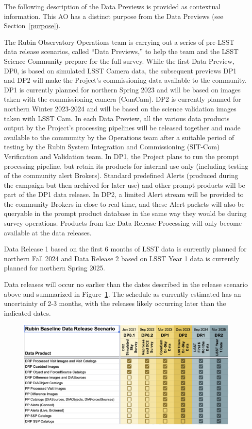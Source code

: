\documentclass[SE,authoryear,toc]{lsstdoc}
\begin{document}
The following description of the Data Previews is provided as contextual information. This AO has a distinct purpose from the Data Previews (see Section~\ref{purpose}).

The Rubin Observatory Operations team is carrying out a series of pre-LSST data release scenarios, called ``Data Previews,'' to help the team and the LSST Science Community prepare for the full survey. While the first Data Preview, DP0, is based on simulated LSST Camera data, the subsequent previews DP1 and DP2 will make the Project's commissioning data available to the community. DP1 is currently planned for northern Spring 2023 and will be based on images taken with the commissioning camera (ComCam). DP2 is currently planned for northern Winter 2023-2024 and will be based on the science validation images taken with LSST Cam. In each Data Preview, all the various data products output by the Project's processing pipelines will be released together and made available to the community by the Operations team after a suitable period of testing by the Rubin System Integration and Commissioning (SIT-Com) Verification and Validation team. In DP1, the Project plans to run the prompt processing pipeline, but retain its products for internal use only (including testing of the community alert Brokers). Standard predefined Alerts (produced during the campaign but then archived for later use) and other prompt products will be part of the DP1 data release. In DP2, a limited Alert stream will be provided to the community Brokers in close to real time, and these Alert packets will also be queryable in the prompt product database in the same way they would be during survey operations. Products from the Data Release Processing will only become available at the data releases. 

Data Release 1 based on the first 6 months of LSST data is currently planned for northern Fall 2024 and Data Release 2 based on LSST Year 1 data is currently planned for northern Spring 2025.

Data releases will occur no earlier than the dates described in the release scenario above and summarized in Figure~\ref{release_scenarios}. The schedule as currently estimated has an uncertainty of 2-3 months, with the releases likely occurring later than the indicated dates.

\begin{figure}
\label{release_scenarios}
\centering
\includegraphics[width=\textwidth]{rubin_data_release_scenarios.png}
\end{figure}
\end{document}
